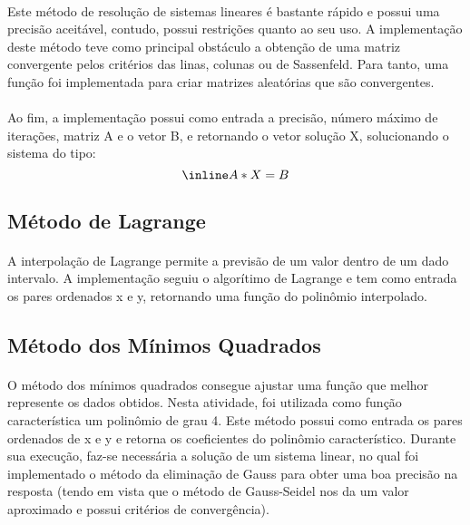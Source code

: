 \documentclass{article}
\begin{document}
\paragraph{}Este método de resolução de sistemas lineares é bastante rápido e possui uma precisão aceitável, contudo, possui restrições quanto ao seu uso. A implementação deste método teve como principal obstáculo a obtenção de uma matriz convergente pelos critérios das linas, colunas ou de Sassenfeld. Para tanto, uma função foi implementada para criar matrizes aleatórias que são convergentes.

\paragraph{}Ao fim, a implementação possui como entrada a precisão, número máximo de iterações, matriz A e o vetor B, e retornando o vetor solução X, solucionando o sistema do tipo:
\[\inline A*X = B\]

\subsection{Método de Lagrange}

\paragraph{}A interpolação de Lagrange permite a previsão de um valor dentro de um dado intervalo. A implementação seguiu o algorítimo de Lagrange e tem como entrada os pares ordenados x e y, retornando uma função do polinômio interpolado.

\subsection{Método dos Mínimos Quadrados}
\paragraph{}O método dos mínimos quadrados consegue ajustar uma função que melhor represente os dados obtidos. Nesta atividade, foi utilizada como função característica um polinômio de grau 4. Este método possui como entrada os pares ordenados de x e y e retorna os coeficientes do polinômio característico. Durante sua execução, faz-se necessária a solução de um sistema linear, no qual foi implementado o método da eliminação de Gauss para obter uma boa precisão na resposta (tendo em vista que o método de Gauss-Seidel nos da um valor aproximado e possui critérios de convergência).
\end{document}
